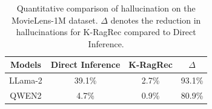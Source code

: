 \begin{table}[t]
  \centering
  \caption{Quantitative comparison of hallucination on the MovieLens-1M dataset. $\Delta$ denotes the reduction in hallucinations for K-RagRec compared to Direct Inference.}
    \scalebox{0.75}
{
    \begin{tabular}{c|c|c|c}
    \toprule
    \toprule
    \multirow{1}{*}{Models}
    & \multicolumn{1}{c|}{Direct Inference} & \multicolumn{1}{c|}{K-RagRec} & \multicolumn{1}{c}{$\Delta$}\\
    \midrule
    LLama-2 &39.1\%  &2.7\% &93.1\% \\
    \midrule
 QWEN2 &4.7\% &0.9\% & 80.9\% \\
    \bottomrule
    \bottomrule
    \end{tabular}%
}
  \label{tab:hallucination}%
\end{table}%